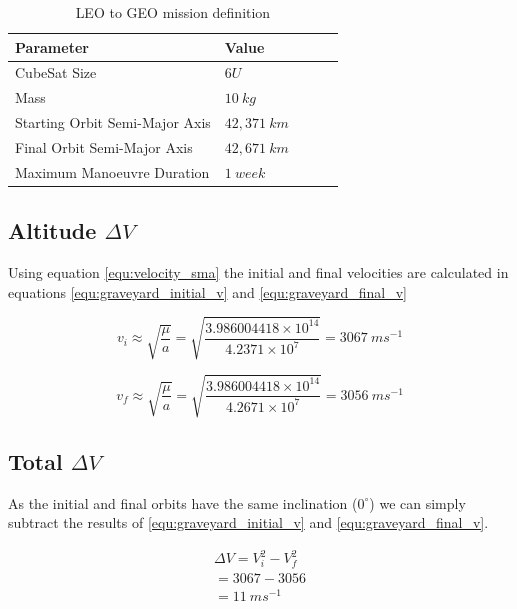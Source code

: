 \documentclass[a4paper, article, oneside, UKenglish]{memoir}
\newcommand{\0}{\mathbf{0}}
\newcommand{\1}{\mathbf{1}}
\begin{document}
\begin{table}[h]
\centering
\begin{tabular}{@{}lllll@{}}
\toprule
Parameter						& Value			\\ \midrule
CubeSat Size					& $6U$			\\
Mass  							& $10~kg$		\\
Starting Orbit Semi-Major Axis	& $42,371~km$	\\
Final Orbit Semi-Major Axis		& $42,671~km$	\\
Maximum Manoeuvre Duration 		& $1~week$		\\ \bottomrule
\end{tabular}
\captionsetup{justification=centering}
\caption{LEO to GEO mission definition}
\label{tab:graveyard_definition}
\end{table}


\subsection{Altitude $\Delta V$}

Using equation \ref{equ:velocity_sma} the initial and final velocities are calculated in equations \ref{equ:graveyard_initial_v} and \ref{equ:graveyard_final_v}

\begin{equation}
v_i \approx \sqrt{ \frac{ \mu }{a} } = \sqrt{ \frac{ 3.986004418 \times 10^{14} }{4.2371 \times 10^{7}} } = 3067~ms^{-1}
\label{equ:graveyard_initial_v}
\end{equation}

\begin{equation}
v_f \approx \sqrt{ \frac{ \mu }{a} } = \sqrt{ \frac{ 3.986004418 \times 10^{14} }{4.2671 \times 10^{7}} } = 3056~ms^{-1} 
\label{equ:graveyard_final_v}
\end{equation}


\subsection{Total $\Delta V$}

As the initial and final orbits have the same inclination ($0^\circ$) we can simply subtract the results of  \ref{equ:graveyard_initial_v} and \ref{equ:graveyard_final_v}.

\begin{equation}
\begin{split}
\Delta V = V_i^2 - V_f^2 \\ 
= 3067 - 3056 \\
= 11~ms^{-1}
\end{split}
\label{equ:graveyard_deltav}
\end{equation}
\end{document}
